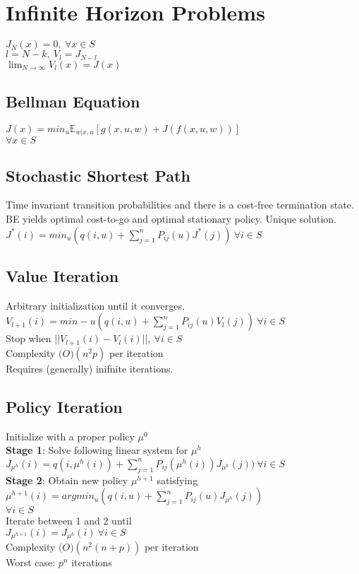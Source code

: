 \section*{Infinite Horizon Problems}
$J_N(x) = 0, \ \forall x \in S$\\
$l = N-k, \ V_l = J_{N-l}$\\
$\lim_{N\rightarrow \infty} V_l(x) = J(x)$

\subsection*{Bellman Equation}
$J(x) = min_u \mathbb{E}_{w|x,u}[g(x,u,w) + J(f(x,u,w))]$\\
$\forall x \in S$

\subsection*{Stochastic Shortest Path}
Time invariant transition probabilities and there is a cost-free termination state. BE yields optimal cost-to-go and optimal stationary policy. Unique solution. \\
$J^*(i) = min_u (q(i,u)+\sum_{j=1}^n P_{ij}(u)J^*(j)) \ \forall i \in S$
\subsection*{Value Iteration}
Arbitrary initialization until it converges.\\
$V_{l+1}(i) = min-u (q(i, u) + \sum_{j=1}^nP_{ij}(u)V_l(j))\ \forall i \in S$\\
Stop when $||V_{l+1}(i) - V_l(i)||, \ \forall i \in S$\\
Complexity $\mathbb(O)(n^2p)$ per iteration\\
Requires (generally) inifnite iterations.\\
\subsection*{Policy Iteration}
Initialize with a proper policy $\mu^0$\\
\textbf{Stage 1}: Solve following linear system for $\mu^h$\\
$J_{\mu^h}(i) = q(i,\mu^h(i))+\sum_{j=1}^n P_{ij}(\mu^h(i))J_{\mu^h}(j)) \ \forall i \in S$\\
\textbf{Stage 2}: Obtain new policy $\mu^{h+1}$ satisfying\\
$\mu^{h+1}(i) = argmin_u (q(i,u)+\sum_{j=1}^n P_{ij}(u)J_{\mu^h}(j))$\\
$\forall i \in S$\\
Iterate between 1 and 2 until\\
$J_{\mu^{h+1}}(i) = J_{\mu^h}(i)\ \forall i \in S$\\
Complexity $\mathbb(O)(n^2(n+p))$ per iteration\\
Worst case: $p^n$ iterations
